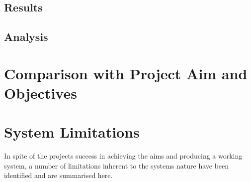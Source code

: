 
\subsection{Results}





\subsection{Analysis}





\section{Comparison with Project Aim and Objectives}





\section{System Limitations}

In spite of the projects success in achieving the aims and producing a working system, a number of limitations inherent to the systems nature have been identified and are summarised here.

